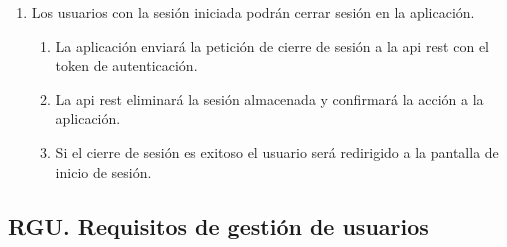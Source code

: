 \begin{enumerate}[label*=RSU \arabic*.]
\begin{enumerate}[label*=\arabic*.]
\begin{enumerate}[label*=\arabic*.]
\begin{enumerate}[label*=\arabic*.]
                \item Tras la creación exitosa del perfil, el usuario será dado de alta siguiendo .
            \end{enumerate}
        \end{enumerate}
        \item La sesión podrá ser renovada con una solicitud a la \acrshort{api} \acrshort{rest} con el \gls{token} de refresco de sesión mientras este siga siendo válido.
            \begin{enumerate}[label*=\arabic*.]
                \item Refrescar una sesión generará una tupla como la de  y sustituirá la almacenada anteriormente.
                \item La \acrshort{api} \acrshort{rest} responderá con la información de la sesión de usuario como en .
                \item Al refrescar una sesión los \glspl{token} anteriores quedarán invalidados.
            \end{enumerate}
    \end{enumerate}
    \item \label{req:cierre_sesion} Los usuarios con la sesión iniciada podrán cerrar sesión en la aplicación.
    \begin{enumerate}[label*=\arabic*.]
        \item La aplicación enviará la petición de cierre de sesión a la \acrshort{api} \acrshort{rest} con el \gls{token} de autenticación.
        \item La \acrshort{api} \acrshort{rest} eliminará la sesión almacenada y confirmará la acción a la aplicación.
        \item Si el cierre de sesión es exitoso el usuario será redirigido a la pantalla de inicio de sesión.
    \end{enumerate}
\end{enumerate}

\subsection{RGU. Requisitos de gestión de usuarios}

